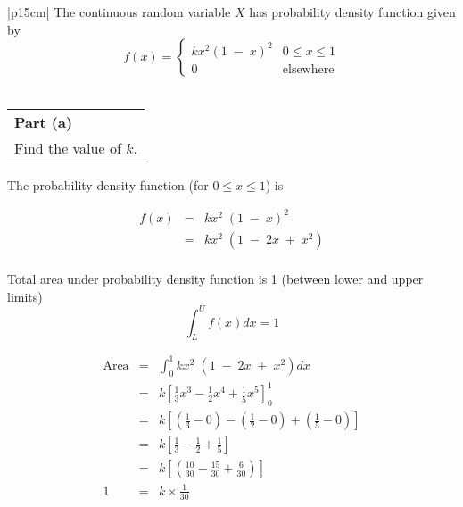 \documentclass[a4paper,30pt]{article}
\begin{document}
\begin{table}[ht!]
     \centering
     \begin{tabular}{|p{15cm}|}
     \hline   \large     
\noindent  \large The continuous random variable $X$ has probability density function given by
\[ f(x) = \begin{cases}  kx^2(1\;-\;x)^2  & 0 \leq x \leq 1\\
0 &  \mbox{elsewhere}
\end{cases}
\]
\\ \hline
      \end{tabular}
    \end{table}

\begin{table}[ht!]
     \centering
     \begin{tabular}{|p{15cm}|}
     \hline \large        
\noindent \textbf{Part (a)} \\ \large Find the value of $k$.%


\\ \hline
      \end{tabular}
    \end{table}
\large    

The probability density function (for $ 0 \leq x \leq 1$) is

\begin{eqnarray*}
f(x) &=&   kx^2\;(1\;-\;x)^2  \\
&=& kx^2\;(1\;-\;2x\;+\;x^2) \\
\end{eqnarray*}

\begin{framed}
\noindent Total area under probability density function is 1 (between lower and upper limits)
{
\Large
\[\int^{U}_{L} f(x) dx = 1\]
}
\end{framed}
\newpage

\begin{eqnarray*}
\mbox{Area} &=& \int^{1}_{0} kx^2\;(1\;-\;2x\;+\;x^2) dx \\
&=& k \left[ \frac{1}{3}x^3 - \frac{1}{2}x^4 + \frac{1}{5}x^5 \right]^{1}_{0}\\
&=& k \left[  \left( \frac{1}{3} - 0 \right)  -  \left(\frac{1}{2} - 0 \right) +  \left( \frac{1}{5} - 0 \right) \right]\\
&=& k \left[  \frac{1}{3} - \frac{1}{2} + \frac{1}{5} \right]\\
&=& k \left[  \left(\frac{10}{30} - \frac{15}{30} + \frac{6}{30}\right)\right]\\
1 &=& k \times \frac{1}{30} \\
\end{eqnarray*}
\end{document}
